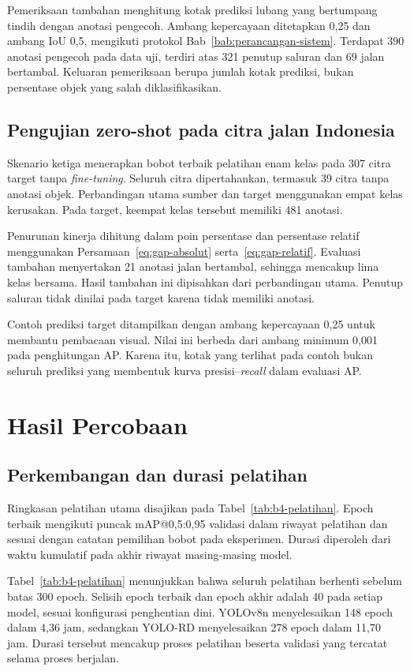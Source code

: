 Pemeriksaan tambahan menghitung kotak prediksi lubang yang bertumpang tindih dengan anotasi pengecoh. Ambang kepercayaan ditetapkan 0,25 dan ambang IoU 0,5, mengikuti protokol Bab~\ref{bab:perancangan-sistem}. Terdapat 390 anotasi pengecoh pada data uji, terdiri atas 321 penutup saluran dan 69 jalan bertambal. Keluaran pemeriksaan berupa jumlah kotak prediksi, bukan persentase objek yang salah diklasifikasikan.

\subsection{Pengujian zero-shot pada citra jalan Indonesia}
Skenario ketiga menerapkan bobot terbaik pelatihan enam kelas pada 307 citra target tanpa \textit{fine-tuning}. Seluruh citra dipertahankan, termasuk 39 citra tanpa anotasi objek. Perbandingan utama sumber dan target menggunakan empat kelas kerusakan. Pada target, keempat kelas tersebut memiliki 481 anotasi.

Penurunan kinerja dihitung dalam poin persentase dan persentase relatif menggunakan Persamaan~\eqref{eq:gap-absolut} serta~\eqref{eq:gap-relatif}. Evaluasi tambahan menyertakan 21 anotasi jalan bertambal, sehingga mencakup lima kelas bersama. Hasil tambahan ini dipisahkan dari perbandingan utama. Penutup saluran tidak dinilai pada target karena tidak memiliki anotasi.

Contoh prediksi target ditampilkan dengan ambang kepercayaan 0,25 untuk membantu pembacaan visual. Nilai ini berbeda dari ambang minimum 0,001 pada penghitungan AP. Karena itu, kotak yang terlihat pada contoh bukan seluruh prediksi yang membentuk kurva presisi--\textit{recall} dalam evaluasi AP.

\section{Hasil Percobaan}
\subsection{Perkembangan dan durasi pelatihan}
\label{subsec:b4-pelatihan}
Ringkasan pelatihan utama disajikan pada Tabel~\ref{tab:b4-pelatihan}. Epoch terbaik mengikuti puncak mAP@0,5:0,95 validasi dalam riwayat pelatihan dan sesuai dengan catatan pemilihan bobot pada eksperimen. Durasi diperoleh dari waktu kumulatif pada akhir riwayat masing-masing model.

Tabel~\ref{tab:b4-pelatihan} menunjukkan bahwa seluruh pelatihan berhenti sebelum batas 300 epoch. Selisih epoch terbaik dan epoch akhir adalah 40 pada setiap model, sesuai konfigurasi penghentian dini. YOLOv8n menyelesaikan 148 epoch dalam 4,36 jam, sedangkan YOLO-RD menyelesaikan 278 epoch dalam 11,70 jam. Durasi tersebut mencakup proses pelatihan beserta validasi yang tercatat selama proses berjalan.

